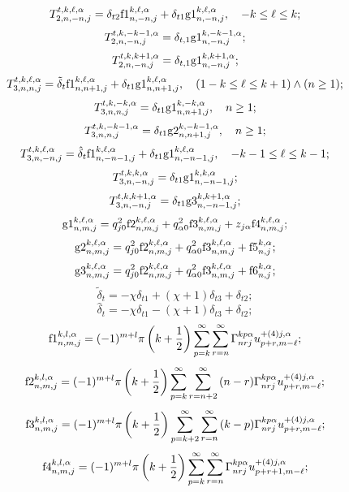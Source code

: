 \begin{russian}
\begin{theorem}
\[T_{2,n, - n,j}^{t,k,\ell ,\alpha } = {\delta _{t2}}{\rm{f1}}_{n, - n,j}^{k,\ell ,\alpha } + {\delta _{t1}}{\rm g1}_{n, - n,j}^{k,\ell ,\alpha },\quad - k \le \ell  \le k;\]
\[T_{2,n, - n,j}^{t,k,-k-1,\alpha } =  {\delta _{t,1}}{\rm g1}_{n, - n,j}^{k,-k-1,\alpha };\]
\[T_{2,n, - n,j}^{t,k,k + 1,\alpha } =  {\delta _{t,1}}{\rm g1}_{n, - n,j}^{k,k + 1,\alpha };\]
\[T_{3,n,n,j}^{t,k,\ell ,\alpha } = {\tilde \delta _t}{\rm{f1}}_{n,n + 1,j}^{k,\ell ,\alpha } + {\delta _{t1}}{\rm g1}_{n,n + 1,j}^{k,\ell ,\alpha },\quad (1 - k \le \ell  \le k + 1) \wedge (n \ge 1);\]
\[T_{3,n,n,j}^{t,k, - k,\alpha } = {\delta _{t1}}{\rm g1}_{n,n + 1,j}^{k, - k,\alpha },\quad n\ge 1;\]
\[T_{3,n,n,j}^{t,k, - k - 1,\alpha } = {\delta _{t1}}{\rm g2}_{n,n + 1,j}^{k, - k - 1,\alpha },\quad n\ge 1;\]
\[T_{3,n, - n,j}^{t,k,\ell ,\alpha } = {\hat \delta _t}{\rm{f1}}_{n, - n - 1,j}^{k,\ell ,\alpha } + {\delta _{t1}}{\rm g1}_{n, - n - 1,j}^{k,\ell ,\alpha },\quad - k - 1 \le \ell  \le k - 1;\]
\[T_{3,n, - n,j}^{t,k,k,\alpha } = {\delta _{t1}}{\rm g1}_{n, - n - 1,j}^{k,k,\alpha };\]
\[T_{3,n, - n,j}^{t,k,k + 1,\alpha } = {\delta _{t1}}{\rm g3}_{n, - n - 1,j}^{k,k + 1,\alpha };\]
\[{\rm g1}_{n,m,j}^{k,\ell ,\alpha } = {{q}}_{j0}^2{\rm{f2}}_{n,m,j}^{k,\ell ,\alpha } + {{q}}_{\alpha 0}^2{\rm{f3}}_{n,m,j}^{k,\ell ,\alpha } + {{{z}}_{{{j}}\alpha }}{\rm{f4}}_{n,m,j}^{k,\ell ,\alpha };\]
\[{\rm g2}_{n,m,j}^{k,\ell ,\alpha } = {{q}}_{j0}^2{\rm{f2}}_{n,m,j}^{k,\ell ,\alpha } + {{q}}_{\alpha 0}^2{\rm{f3}}_{n,m,j}^{k,\ell ,\alpha } + {\rm{f5}}_{n,j}^{k,\alpha };\]
\[{\rm g3}_{n,m,j}^{k,\ell ,\alpha } = {{q}}_{j0}^2{\rm{f2}}_{n,m,j}^{k,\ell ,\alpha } + {{q}}_{\alpha 0}^2{\rm{f3}}_{n,m,j}^{k,\ell ,\alpha } + {\rm{f6}}_{n,j}^{k,\alpha };\]
\[{\tilde \delta _t} =  - \chi {\delta _{t1}} + (\chi  + 1){\delta _{t3}} + {\delta _{t2}};\]
\[{\hat \delta _t} =  - \chi {\delta _{t1}} - (\chi  + 1){\delta _{t3}} + {\delta _{t2}};\]
\[{\rm{f1}}_{n,m,j}^{k,l,\alpha } = (-1)^{m+l}\pi \left( {k + \frac{1}{2}} \right)\sum\limits_{p = k}^\infty  {\sum\limits_{r = n}^\infty  {\Gamma _{nrj}^{kp\alpha }{u}_{p + r,m - \ell }^{ + (4)j,\alpha }} };\]
\[{\rm{f2}}_{n,m,j}^{k,l,\alpha } = (-1)^{m+l}\pi \left( {k + \frac{1}{2}} \right)\sum\limits_{p = k}^\infty  {\sum\limits_{r = n + 2}^\infty  {(n - r)\Gamma _{nrj}^{kp\alpha }{u}_{p + r,m - \ell }^{ + (4)j,\alpha }} };\]
\[{\rm{f3}}_{n,m,j}^{k,l,\alpha } = (-1)^{m+l}\pi \left( {k + \frac{1}{2}} \right)\sum\limits_{p = k + 2}^\infty  {\sum\limits_{r = n}^\infty  {(k - p)\Gamma _{nrj}^{kp\alpha }{u}_{p + r,m - \ell }^{ + (4)j,\alpha }} };\]
\[{\rm{f4}}_{n,m,j}^{k,l,\alpha } = (-1)^{m+l}\pi \left( {k + \frac{1}{2}} \right)\sum\limits_{p = k}^\infty  {\sum\limits_{r = n}^\infty  {\Gamma _{nrj}^{kp\alpha }{u}_{p + r + 1,m - \ell }^{ + (4)j,\alpha }} };\]

\end{theorem}
\end{russian}
